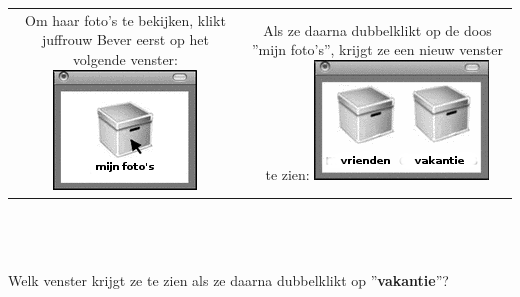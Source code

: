 \documentclass[12pt, a4paper]{article}
\begin{document}
\begin{minipage}{\textwidth}
			\begin{tabulary}{\linewidth}{C C}
				Om haar foto's te bekijken, klikt juffrouw Bever eerst op het volgende venster:
				\includegraphics[width=\linewidth]{image1} &
				Als ze daarna dubbelklikt op de doos ''mijn foto's'', krijgt ze een nieuw venster te zien:
				\includegraphics[width=\linewidth]{image2} \\
			\end{tabulary} \\ \\ \\
			Welk venster krijgt ze te zien als ze daarna dubbelklikt op ''\textbf{vakantie}''?
	

\end{minipage}
\end{document}
